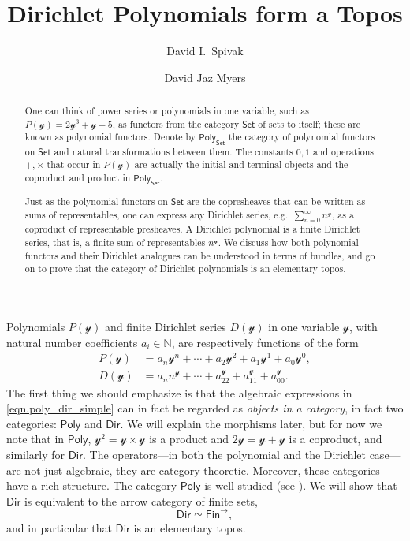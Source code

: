 \documentclass[11pt, article, one side]{memoir}
\theoremstyle{theorem}
\theoremstyle{definition}
\theoremstyle{remark}
\newcommand{\cat}[1]{\mathcal{#1}}%
\newcommand{\Cat}[1]{\mathsf{#1}}%
\newcommand{\nn}{\mathbb{N}}
\newcommand{\smset}{\Cat{Set}}
\newcommand{\fin}{\Cat{Fin}}
\newcommand{\yon}{\mathcal{y}}
\newcommand{\poly}{\Cat{Poly}}
\newcommand{\dir}{\Cat{Dir}}
\begin{document}
\title{Dirichlet Polynomials form a Topos}

\author{David I.\ Spivak%
\and David Jaz Myers%
}

\maketitle
\begin{abstract}
One can think of power series or polynomials in one variable, such as $P(\yon)=2\yon^3+\yon+5$, as functors from the category $\smset$ of sets to itself; these are known as polynomial functors. Denote by $\poly_\smset$ the category of polynomial functors on $\smset$ and natural transformations between them. The constants $0,1$ and operations $+,\times$ that occur in $P(\yon)$ are actually the initial and terminal objects and the coproduct and product in $\poly_\smset$. 

Just as the polynomial functors on $\smset$ are the copresheaves that can be written as sums of representables, one can express any Dirichlet series, e.g.\ $\sum_{n=0}^\infty n^\yon$, as a coproduct of representable presheaves. A Dirichlet polynomial is a finite Dirichlet series, that is, a finite sum of representables $n^{\yon}$. We discuss how both polynomial functors and their Dirichlet analogues can be understood in terms of bundles, and go on to prove that the category of Dirichlet polynomials is an elementary topos.

\end{abstract}

Polynomials $P(\yon)$ and finite Dirichlet series $D(\yon)$ in one variable $\cat{y}$, with natural number coefficients $a_i\in\nn$, are respectively functions of the form
\begin{equation}\label{eqn.poly_dir_simple}
\begin{aligned}
  P(\yon)&=a_n\yon^n+\cdots+a_2\yon^2+a_1\yon^1+a_0\yon^0,\\
  D(\yon)&=a_n n^\yon+\cdots+a_22^\yon+a_11^\yon+a_00^\yon.
\end{aligned}
\end{equation}
The first thing we should emphasize is that the algebraic expressions in \eqref{eqn.poly_dir_simple} can in fact be regarded as \emph{objects in a category}, in fact two categories: $\poly$ and $\dir$. We will explain the morphisms later, but for now we note that in $\poly$, $\yon^2=\yon\times\yon$ is a product and $2\yon=\yon+\yon$ is a coproduct, and similarly for $\dir$. The operators---in both the polynomial and the Dirichlet case---are not just algebraic, they are category-theoretic. Moreover, these categories have a rich structure. The category $\poly$ is well studied (see \cite{GK:Polynomial.Functors}). We will show that $\dir$ is equivalent to the arrow category of finite sets, 
\[\dir \simeq \fin^{\to},\]
and in particular that $\dir$ is an elementary topos.
\end{document}
